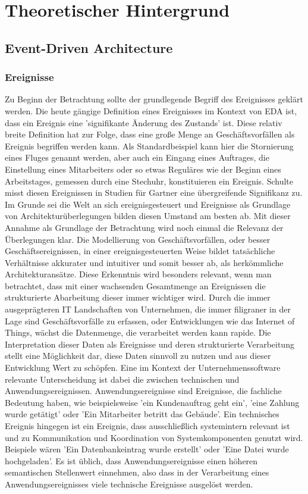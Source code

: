 \section{Theoretischer Hintergrund}
\subsection{Event-Driven Architecture}
\subsubsection*{Ereignisse}
Zu Beginn der Betrachtung sollte der grundlegende Begriff des Ereignisses geklärt werden. Die heute gängige Definition eines Ereignisses im Kontext von \ac*{EDA} ist, dass ein Ereignis eine 'signifikante Änderung des Zustands' ist.\cite[Vgl.][S. 4]{EDA2006} Diese relativ breite Definition hat zur Folge, dass eine große Menge an Geschäftsvorfällen als Ereignis begriffen werden kann. Als Standardbeispiel kann hier die Stornierung eines Fluges genannt werden, aber auch ein Eingang eines Auftrages, die Einstellung eines Mitarbeiters oder so etwas Reguläres wie der Beginn eines Arbeitstages, gemessen durch eine Stechuhr, konstituieren ein Ereignis. Schulte misst diesen Ereignissen in Studien für Gartner eine übergreifende Signifikanz zu. Im Grunde sei die Welt an sich ereignisgesteuert und Ereignisse als Grundlage von Architekturüberlegungen bilden diesen Umstand am besten ab. \cite[Vgl. ][S. 2]{schulte2003growing} Mit dieser Annahme als Grundlage der Betrachtung wird noch einmal die Relevanz der Überlegungen klar. Die Modellierung von Geschäftsvorfällen, oder besser Geschäftsereignissen, in einer ereignisgesteuerten Weise bildet tatsächliche Verhältnisse akkurater und intuitiver und somit besser ab, als herkömmliche Architekturansätze. \cite[Vgl. ][S. 13]{EDA2010} Diese Erkenntnis wird besonders relevant, wenn man betrachtet, dass mit einer wachsenden Gesamtmenge an Ereignissen die strukturierte Abarbeitung dieser immer wichtiger wird. Durch die immer ausgeprägteren \ac{IT} Landschaften von Unternehmen, die immer filigraner in der Lage sind Geschäftsvorfälle zu erfassen, oder Entwicklungen wie das Internet of Things, wächst die Datenmenge, die verarbeitet werden kann rapide. Die Interpretation dieser Daten als Ereignisse und deren strukturierte Verarbeitung stellt eine Möglichkeit dar, diese Daten sinnvoll zu nutzen und aus dieser Entwicklung Wert zu schöpfen.\cite[Vgl. ][S. 16]{EDA2010} 
Eine im Kontext der Unternehmenssoftware relevante Unterscheidung ist dabei die zwischen technischen und Anwendungsereignissen. Anwendungsereignisse sind Ereignisse, die fachliche Bedeutung haben, wie beispielsweise 'ein Kundenauftrag geht ein', 'eine Zahlung wurde getätigt' oder 'Ein Mitarbeiter betritt das Gebäude'. Ein technisches Ereignis hingegen ist ein Ereignis, dass ausschließlich systemintern relevant ist und zu Kommunikation und Koordination von Systemkomponenten genutzt wird. Beispiele wären 'Ein Datenbankeintrag wurde erstellt' oder 'Eine Datei wurde hochgeladen'. Es ist üblich, dass Anwendungsereignisse einen höheren semantischen Stellenwert einnehmen, also dass in der Verarbeitung eines Anwendungsereignisses viele technische Ereignisse ausgelöst werden. \cite[Vgl. ][S. 245f]{CLOUD2021}
